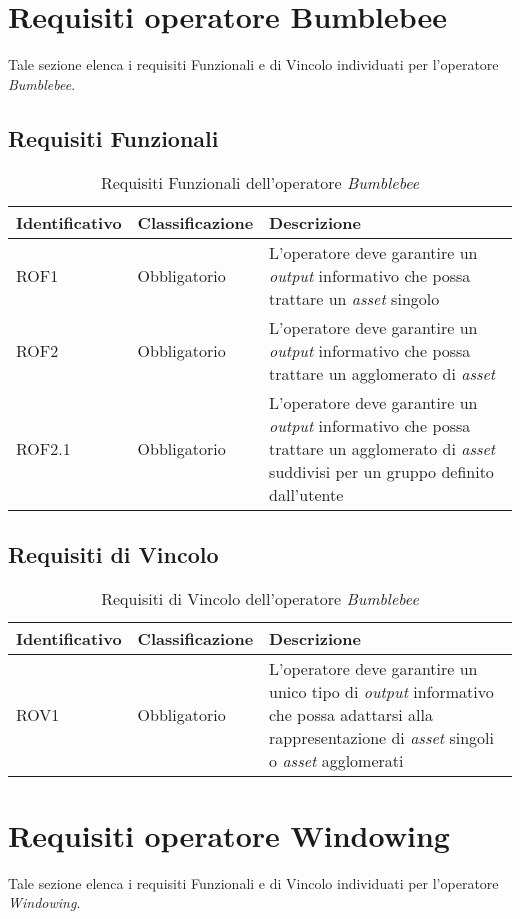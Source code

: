 \section{Requisiti operatore Bumblebee}
Tale sezione elenca i requisiti Funzionali e di Vincolo individuati per l'operatore \textit{Bumblebee}.
\subsection{Requisiti Funzionali}
{
\centering
\begin{longtable}{L{3cm} L{3cm} L{7.5cm}}
\caption{Requisiti Funzionali dell'operatore \textit{Bumblebee}}\\
\textbf{Identificativo} &
\textbf{Classificazione}&
\textbf{Descrizione}\\
\endhead
\hline

ROF1 & Obbligatorio & L'operatore deve garantire un \textit{output} informativo che possa trattare un \textit{asset} singolo\\
\hline
ROF2 & Obbligatorio & L'operatore deve garantire un \textit{output} informativo che possa trattare un agglomerato di \textit{asset}\\
\hline
ROF2.1 & Obbligatorio & L'operatore deve garantire un \textit{output} informativo che possa trattare un agglomerato di \textit{asset} suddivisi per un gruppo definito dall'utente\\
\hline
\end{longtable}
}

\subsection{Requisiti di Vincolo}
{
\centering
\begin{longtable}{L{3cm} L{3cm} L{7.5cm}}
\caption{Requisiti di Vincolo dell'operatore \textit{Bumblebee}}\\
\textbf{Identificativo} &
\textbf{Classificazione}&
\textbf{Descrizione}\\
\endhead
\hline

ROV1 & Obbligatorio & L'operatore deve garantire un unico tipo di \textit{output} informativo che possa adattarsi alla rappresentazione di \textit{asset} singoli o \textit{asset} agglomerati\\
\hline
\end{longtable}
}





\section{Requisiti operatore Windowing}
Tale sezione elenca i requisiti Funzionali e di Vincolo individuati per l'operatore \textit{Windowing}.
